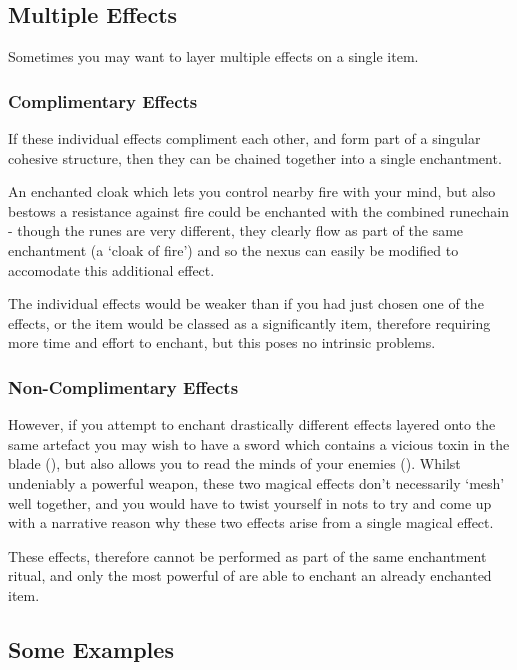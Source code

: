 \subsection{Multiple Effects}

Sometimes you may want to layer multiple effects on a single item. 

\subsubsection{Complimentary Effects} 

If these individual effects compliment each other, and form part of a singular cohesive structure, then they can be chained together into a single enchantment. 

An enchanted cloak which lets you control nearby fire with your mind, but also bestows a resistance against fire could be enchanted with the combined runechain \rune{\mentis\velox\primum\iuxta\aeternum\clypus} - though the runes are very different, they clearly flow as part of the same enchantment (a `cloak of fire') and so the nexus can easily be modified to accomodate this additional effect. 

The individual effects would be weaker than if you had just chosen one of the effects, or the item would be classed as a significantly  item, therefore requiring more time and effort to enchant, but this poses no intrinsic problems. 

\subsubsection{Non-Complimentary Effects}

However, if you attempt to enchant drastically different effects layered onto the same artefact \minus{} you may wish to have a sword which contains a vicious toxin in the blade (\rune{\sessio\displos\morbus}), but also allows you to read the minds of your enemies (\rune{\mentis\velox\animus}). Whilst undeniably a powerful weapon, these two magical effects don't necessarily `mesh' well together, and you would have to twist yourself in nots to try and come up with a narrative reason why these two effects arise from a single magical effect. 

These effects, therefore cannot be performed as part of the same enchantment ritual, and only the most powerful of  are able to enchant an already enchanted item. 


\subsection{Some Examples}\label{E:EnchantingExamples}

